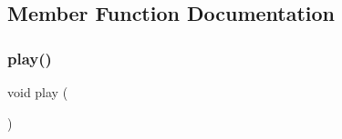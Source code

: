 \subsection{Member Function Documentation}
\mbox{\label{classSound_a6d58098c6cf63c241ed03bc797256bb1}} 
\subsubsection{\texorpdfstring{play()}{play()}}
{\footnotesize\ttfamily void play (\begin{DoxyParamCaption}{ }\end{DoxyParamCaption})}

